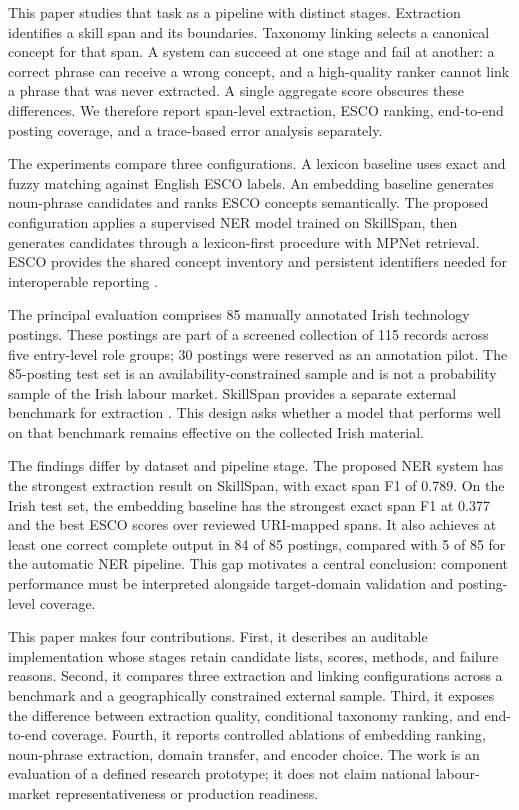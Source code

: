 \documentclass[conference]{IEEEtran}
\begin{document}
This paper studies that task as a pipeline with distinct stages. Extraction identifies a skill span and its boundaries. Taxonomy linking selects a canonical concept for that span. A system can succeed at one stage and fail at another: a correct phrase can receive a wrong concept, and a high-quality ranker cannot link a phrase that was never extracted. A single aggregate score obscures these differences. We therefore report span-level extraction, ESCO ranking, end-to-end posting coverage, and a trace-based error analysis separately.

The experiments compare three configurations. A lexicon baseline uses exact and fuzzy matching against English ESCO labels. An embedding baseline generates noun-phrase candidates and ranks ESCO concepts semantically. The proposed configuration applies a supervised NER model trained on SkillSpan, then generates candidates through a lexicon-first procedure with MPNet retrieval. ESCO provides the shared concept inventory and persistent identifiers needed for interoperable reporting \cite{ESCOPortal,ESCOClassification}.

The principal evaluation comprises 85 manually annotated Irish technology postings. These postings are part of a screened collection of 115 records across five entry-level role groups; 30 postings were reserved as an annotation pilot. The 85-posting test set is an availability-constrained sample and is not a probability sample of the Irish labour market. SkillSpan provides a separate external benchmark for extraction \cite{SkillSpan2022}. This design asks whether a model that performs well on that benchmark remains effective on the collected Irish material.

The findings differ by dataset and pipeline stage. The proposed NER system has the strongest extraction result on SkillSpan, with exact span F1 of 0.789. On the Irish test set, the embedding baseline has the strongest exact span F1 at 0.377 and the best ESCO scores over reviewed URI-mapped spans. It also achieves at least one correct complete output in 84 of 85 postings, compared with 5 of 85 for the automatic NER pipeline. This gap motivates a central conclusion: component performance must be interpreted alongside target-domain validation and posting-level coverage.

This paper makes four contributions. First, it describes an auditable implementation whose stages retain candidate lists, scores, methods, and failure reasons. Second, it compares three extraction and linking configurations across a benchmark and a geographically constrained external sample. Third, it exposes the difference between extraction quality, conditional taxonomy ranking, and end-to-end coverage. Fourth, it reports controlled ablations of embedding ranking, noun-phrase extraction, domain transfer, and encoder choice. The work is an evaluation of a defined research prototype; it does not claim national labour-market representativeness or production readiness.
\end{document}
